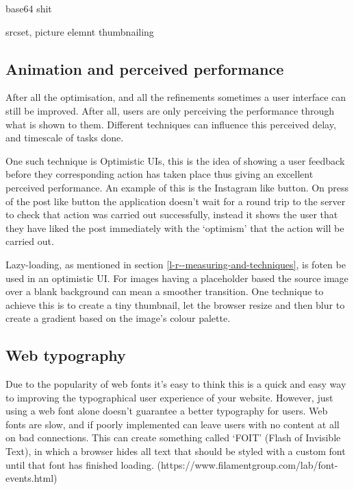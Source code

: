 base64 shit

srcset, picture elemnt thumbnailing

\subsection{Animation and perceived performance}

After all the optimisation, and all the refinements sometimes a user interface can still be improved. After all, users are only perceiving the performance through what is shown to them. Different techniques can influence this perceived delay, and timescale of tasks done.

One such technique is Optimistic UIs, this is the idea of showing a user feedback before they corresponding action has taken place thus giving an excellent perceived performance. An example of this is the Instagram like button. On press of the post like button the application doesn't wait for a round trip to the server to check that action was carried out successfully, instead it shows the user that they have liked the post immediately with the `optimism' that the action will be carried out. \cite{performing_actions_optimisitically}

Lazy-loading, as mentioned in section \ref{l-r--measuring-and-techniques}, is foten be used in an optimistic UI. For images having a placeholder based the source image over a blank background can mean a smoother transition. One technique to achieve this is to create a tiny thumbnail, let the browser resize and then blur to create a gradient based on the image's colour palette. \cite{image_colours_lazy_loading}


\subsection{Web typography}

Due to the popularity of web fonts it's easy to think this is a quick and easy way to improving the typographical user experience of your website. However, just using a web font alone doesn't guarantee a better typography for users. Web fonts are slow, and if poorly implemented can leave users with no content at all on bad connections. This can create something called `FOIT' (Flash of Invisible Text), in which a browser hides all text that should be styled with a custom font until that font has finished loading. (https://www.filamentgroup.com/lab/font-events.html)


